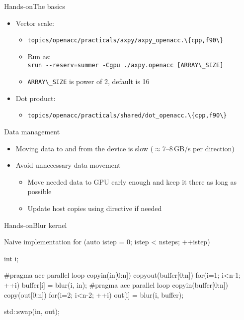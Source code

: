 \documentclass[12pt,aspectratio=169]{beamer}
\newcommand\shinline[2][]{\lstinline[style=shstyle,basicstyle=\ttfamily,#1]!#2!}
\begin{document}
\begin{frame}{Hands-on}{The basics}
  \begin{itemize}
  \item Vector scale:
    \begin{itemize}
    \item \shinline{topics/openacc/practicals/axpy/axpy_openacc.\{cpp,f90\}}
    \item Run as: \\
      \shinline{srun --reserv=summer -Cgpu ./axpy.openacc [ARRAY\_SIZE]}
    \item \shinline{ARRAY\_SIZE} is power of 2, default is 16
    \end{itemize}
    \vfill
  \item Dot product:
    \begin{itemize}
    \item \shinline{topics/openacc/practicals/shared/dot_openacc.\{cpp,f90\}}
    \end{itemize}
  \end{itemize}
\end{frame}

\begin{frame}{Data management}
  \begin{itemize}
  \item Moving data to and from the device is slow ($\approx$7--8\,GB/s per direction)
  \item Avoid unnecessary data movement
    \begin{itemize}
    \item Move needed data to GPU early enough and keep it there as long as possible
    \item Update host copies using  directive if needed
    \end{itemize}
  \end{itemize}
\end{frame}

\begin{frame}[fragile]{Hands-on}{Blur kernel}
  \begin{Cpplisting}{Naive implementation}
for (auto istep = 0; istep < nsteps; ++istep) {
    int i;

    #pragma acc parallel loop copyin(in[0:n]) copyout(buffer[0:n])
    for(i=1; i<n-1; ++i) {
        buffer[i] = blur(i, in);
    }
    #pragma acc parallel loop copyin(buffer[0:n]) copy(out[0:n])
    for(i=2; i<n-2; ++i) {
        out[i] = blur(i, buffer);
    }

    std::swap(in, out);
}
  \end{Cpplisting}
\end{frame}
\end{document}
